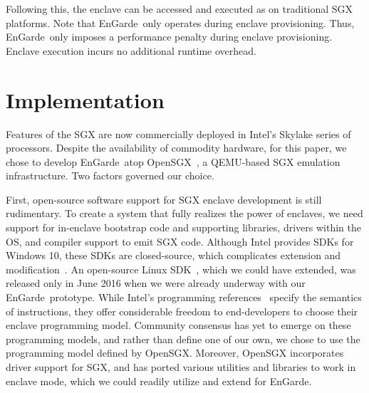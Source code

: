 \documentclass[conference,compsoc]{IEEEtran}
\newcommand{\tool}{EnGarde\xspace} %
\begin{document}
Following this, the enclave can be accessed and executed as on traditional SGX
platforms. Note that \tool\ only operates during enclave provisioning. Thus,
\tool\ only imposes a performance penalty during enclave provisioning. Enclave
execution incurs no additional runtime overhead.


% 

\section{Implementation}
\label{section:implementation}




Features of the SGX are now commercially deployed in Intel's Skylake series of
processors. Despite the availability of commodity hardware, for this paper, we
chose to develop \tool\ atop OpenSGX~\cite{opensgx:ndss16}, a QEMU-based SGX
emulation infrastructure. Two factors governed our choice.

First, open-source software support for SGX enclave development is still
rudimentary. To create a system that fully realizes the power of enclaves, we
need support for in-enclave bootstrap code and supporting libraries, drivers
within the OS, and compiler support to emit SGX code. Although Intel provides
SDKs for Windows 10, these SDKs are closed-source, which complicates extension
and modification~\cite{win10:sdk}. An open-source Linux
SDK~\cite{linuxsdk:june16}, which we could have extended, was released only in
June 2016 when we were already underway with our \tool\ prototype.  While
Intel's programming references~\cite{intelsgx:sep13,intelsgx:oct14} specify the
semantics of instructions, they offer considerable freedom to end-developers to
choose their enclave programming model. Community consensus has yet to emerge
on these programming models, and rather than define one of our own, we chose to
use the programming model defined by OpenSGX. Moreover, OpenSGX incorporates
driver support for SGX, and has ported various utilities and libraries to work
in enclave mode, which we could readily utilize and extend for \tool.
\end{document}
